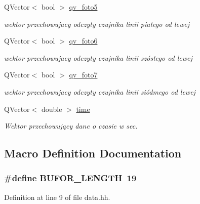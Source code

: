 \begin{DoxyCompactItemize}
Q\+Vector$<$ bool $>$ \hyperlink{data_8hh_a22dfe1075776b28a5f66256ef08fdfec}{qv\+\_\+foto5}
\begin{DoxyCompactList}\small\item\em wektor przechowujacy odczyty czujnika linii piatego od lewej \end{DoxyCompactList}\item 
Q\+Vector$<$ bool $>$ \hyperlink{data_8hh_a1e7c4fd7ccb2eca0520355dcbb83c10a}{qv\+\_\+foto6}
\begin{DoxyCompactList}\small\item\em wektor przechowujacy odczyty czujnika linii szóstego od lewej \end{DoxyCompactList}\item 
Q\+Vector$<$ bool $>$ \hyperlink{data_8hh_ad7da896b30e4453fc5cbb04b34beb26a}{qv\+\_\+foto7}
\begin{DoxyCompactList}\small\item\em wektor przechowujacy odczyty czujnika linii siódmego od lewej \end{DoxyCompactList}\item 
Q\+Vector$<$ double $>$ \hyperlink{data_8hh_a47dc728f262872d5f1d2bbdc7538e118}{time}
\begin{DoxyCompactList}\small\item\em Wektor przechowujący dane o czasie w sec. \end{DoxyCompactList}\end{DoxyCompactItemize}


\subsection{Macro Definition Documentation}
\subsubsection[{\texorpdfstring{B\+U\+F\+O\+R\+\_\+\+L\+E\+N\+G\+TH}{BUFOR_LENGTH}}]{\setlength{\rightskip}{0pt plus 5cm}\#define B\+U\+F\+O\+R\+\_\+\+L\+E\+N\+G\+TH~19}\hypertarget{data_8hh_a21b07b7bdba051b0e5e6102011204b3b}{}\label{data_8hh_a21b07b7bdba051b0e5e6102011204b3b}


Definition at line 9 of file data.\+hh.

